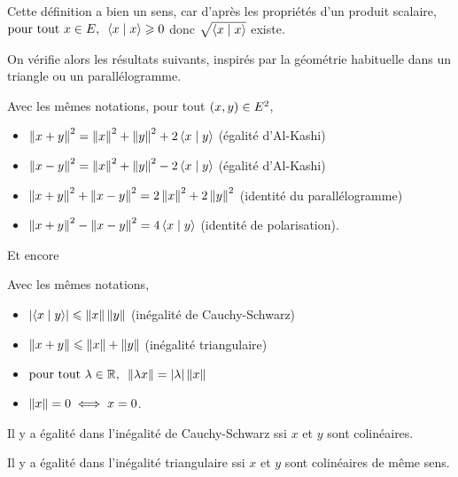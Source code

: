 \begin{rem}
Cette définition a bien un sens, car d'après les propriétés d'un produit scalaire, \(\quantifs{\tpt x\in E}\ps{x}{x}\geq0\) donc \(\sqrt{\ps{x}{x}}\) existe.
\end{rem}

On vérifie alors les résultats suivants, inspirés par la géométrie habituelle dans un triangle ou un parallélogramme.

\begin{prop}
Avec les mêmes notations, pour tout \(\left(x,y\right)\in E^2\),

\begin{itemize}
    \item \(\norme{x+y}^2=\norme{x}^2+\norme{y}^2+2\ps{x}{y}\) (égalité d'Al-Kashi) \\
    \item \(\norme{x-y}^2=\norme{x}^2+\norme{y}^2-2\ps{x}{y}\) (égalité d'Al-Kashi) \\
    \item \(\norme{x+y}^2+\norme{x-y}^2=2\norme{x}^2+2\norme{y}^2\) (identité du parallélogramme) \\
    \item \(\norme{x+y}^2-\norme{x-y}^2=4\ps{x}{y}\) (identité de polarisation).
\end{itemize}
\end{prop}

Et encore

\begin{prop}
Avec les mêmes notations,

\begin{itemize}
    \item \(\abs{\ps{x}{y}}\leq\norme{x}\norme{y}\) (inégalité de Cauchy-Schwarz) \\
    \item \(\norme{x+y}\leq\norme{x}+\norme{y}\) (inégalité triangulaire) \\
    \item \(\quantifs{\tpt\lambda\in\R}\norme{\lambda x}=\abs{\lambda}\norme{x}\) \\
    \item \(\norme{x}=0\ssi x=0\).
\end{itemize}
\end{prop}

\begin{rem}
Il y a égalité dans l'inégalité de Cauchy-Schwarz ssi \(x\) et \(y\) sont colinéaires.

Il y a égalité dans l'inégalité triangulaire ssi \(x\) et \(y\) sont colinéaires de même sens.
\end{rem}

